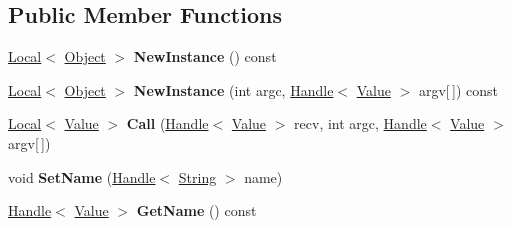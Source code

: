 \subsection*{Public Member Functions}
\begin{DoxyCompactItemize}
\item 
\hypertarget{classv8_1_1Function_a2bbac81200b840cbd484679aaa5b03d4}{\hyperlink{classv8_1_1Local}{Local}$<$ \hyperlink{classv8_1_1Object}{Object} $>$ {\bfseries New\-Instance} () const }\label{classv8_1_1Function_a2bbac81200b840cbd484679aaa5b03d4}

\item 
\hypertarget{classv8_1_1Function_a1261371c01bf18be5564f290af22e9d9}{\hyperlink{classv8_1_1Local}{Local}$<$ \hyperlink{classv8_1_1Object}{Object} $>$ {\bfseries New\-Instance} (int argc, \hyperlink{classv8_1_1Handle}{Handle}$<$ \hyperlink{classv8_1_1Value}{Value} $>$ argv\mbox{[}$\,$\mbox{]}) const }\label{classv8_1_1Function_a1261371c01bf18be5564f290af22e9d9}

\item 
\hypertarget{classv8_1_1Function_a09b1a95dcd397bfad9d39942605dc3ce}{\hyperlink{classv8_1_1Local}{Local}$<$ \hyperlink{classv8_1_1Value}{Value} $>$ {\bfseries Call} (\hyperlink{classv8_1_1Handle}{Handle}$<$ \hyperlink{classv8_1_1Value}{Value} $>$ recv, int argc, \hyperlink{classv8_1_1Handle}{Handle}$<$ \hyperlink{classv8_1_1Value}{Value} $>$ argv\mbox{[}$\,$\mbox{]})}\label{classv8_1_1Function_a09b1a95dcd397bfad9d39942605dc3ce}

\item 
\hypertarget{classv8_1_1Function_a5e244ce13d6f30ffa69f520126ada795}{void {\bfseries Set\-Name} (\hyperlink{classv8_1_1Handle}{Handle}$<$ \hyperlink{classv8_1_1String}{String} $>$ name)}\label{classv8_1_1Function_a5e244ce13d6f30ffa69f520126ada795}

\item 
\hypertarget{classv8_1_1Function_adbbf95a036859381c06af3d05cd74b07}{\hyperlink{classv8_1_1Handle}{Handle}$<$ \hyperlink{classv8_1_1Value}{Value} $>$ {\bfseries Get\-Name} () const }\label{classv8_1_1Function_adbbf95a036859381c06af3d05cd74b07}


\end{DoxyCompactItemize}
